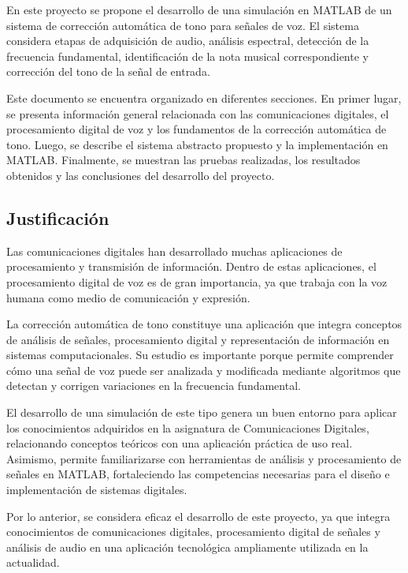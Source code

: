 \documentclass[12pt]{article}
\begin{document}
En este proyecto se propone el desarrollo de una simulación en MATLAB de un sistema de corrección automática de tono para señales de voz. El sistema considera etapas de adquisición de audio, análisis espectral, detección de la frecuencia fundamental, identificación de la nota musical correspondiente y corrección del tono de la señal de entrada.

Este documento se encuentra organizado en diferentes secciones. En primer lugar, se presenta información general relacionada con las comunicaciones digitales, el procesamiento digital de voz y los fundamentos de la corrección automática de tono. Luego, se describe el sistema abstracto propuesto y la implementación en MATLAB. Finalmente, se muestran las pruebas realizadas, los resultados obtenidos y las conclusiones del desarrollo del proyecto.



\subsection{Justificación}

Las comunicaciones digitales han desarrollado muchas aplicaciones de procesamiento y transmisión de información. Dentro de estas aplicaciones, el procesamiento digital de voz es de gran importancia, ya que trabaja con la voz humana como medio de comunicación y expresión.

La corrección automática de tono constituye una aplicación que integra conceptos de análisis de señales, procesamiento digital y representación de información en sistemas computacionales. Su estudio es importante porque permite comprender cómo una señal de voz puede ser analizada y modificada mediante algoritmos que detectan y corrigen variaciones en la frecuencia fundamental.

El desarrollo de una simulación de este tipo genera un buen entorno para aplicar los conocimientos adquiridos en la asignatura de Comunicaciones Digitales, relacionando conceptos teóricos con una aplicación práctica de uso real. Asimismo, permite familiarizarse con herramientas de análisis y procesamiento de señales en MATLAB, fortaleciendo las competencias necesarias para el diseño e implementación de sistemas digitales.

Por lo anterior, se considera eficaz el desarrollo de este proyecto, ya que integra conocimientos de comunicaciones digitales, procesamiento digital de señales y análisis de audio en una aplicación tecnológica ampliamente utilizada en la actualidad.
\end{document}
